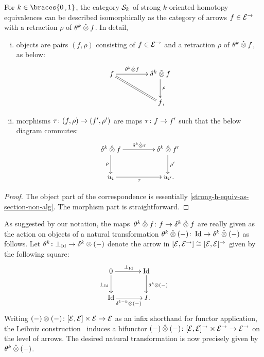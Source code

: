 \documentclass[reqno,10pt,a4paper,oneside,draft]{amsart}
\begin{document}
{{\begin{lemma} \label{strong-h-equiv-as-section}
For $k \in \braces{0\,, 1}$, the category $\cal{S}_k$ of strong $k$-oriented homotopy equivalences can be described isomorphically as the category of arrows $f \in \catE^{\to}$ with a retraction $\rho$ of $\thetak \hatotimes f$.
In detail,
\begin{enumerate}[(i)]
\item objects are pairs $(f, \rho)$ consisting of $f \in \catE^\to$ and a retraction $\rho$ of $\thetak \hatotimes f$, as below:
\[
\xymatrix@C+2em{
  f
  \ar[r]^-{\thetak \hatotimes f}
  \ar@{=}[dr]
&
  \kcyl \hatotimes f \ar[d]^{\rho}
\\&
  f
\rlap{,}}
\]
\item morphisms $\tau \co (f, \rho) \to (f', \rho')$ are maps $\tau \co f \to f'$ such that the below diagram commutes:
\[
\xymatrix@C+2em{
  \kcyl \hatotimes f
  \ar[d]_-{\rho}
  \ar[r]^{\kcyl \hatotimes \tau}
&
 \kcyl \hatotimes f'
  \ar[d]^-{\rho'}
\\
  u_i
  \ar[r]_{\tau}
&
  u_{i'}
\rlap{.}}
\]
\end{enumerate}
\end{lemma}

\begin{proof}
The object part of the correspondence is essentially \cref{strong-h-equiv-as-section-non-alg}.
The morphism part is straightforward.
\end{proof}

\begin{remark} \label{theta}
As suggested by our notation, the maps~$\thetak \hatotimes f \co f \to \kcyl \hatotimes f$ are really given as the action on objects of a natural transformation $\thetak \hatotimes (-) \co \Id \to \delta^k \hatotimes (-)$ as follows.
Let $\theta^k \co \bot_{\Id} \to \delta^k \otimes (-)$ denote the arrow in $[\cal{E}, \cal{E}^\to] \iso [\cal{E}, \cal{E}]^\to$ given by the following square:
\[
\xymatrix@C+1em{
  0
  \ar[r]^{\bot_{\Id}}
  \ar[d]_{\bot_{\Id}}
&
  \Id
  \ar[d]^{\delta^k \otimes (-)}
\\
  \Id
  \ar[r]_{\delta^{1-k} \otimes (-)}
&
  I
\rlap{.}}
\]
Writing $(-) \otimes (-) \co [\cal{E}, \cal{E}] \times \cal{E} \to \cal{E}$ as an infix shorthand for functor application, the Leibniz construction~\cite{riehl-verity:reedy} induces a bifunctor $(-) \hatotimes (-) \co [\cal{E}, \cal{E}]^\to \times \cal{E}^\to \to \cal{E}^\to$ on the level of arrows.
The desired natural transformation is now precisely given by $\theta^k \hatotimes (-)$.
\end{remark}

}}
\end{document}
